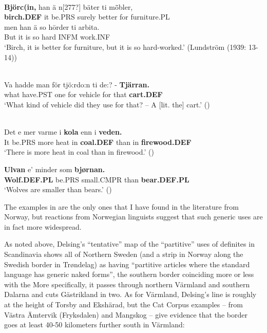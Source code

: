 \z

\ea\label{}
\\
\gll	\textbf{Björc(in,} han  ä  n[277?]  bäter  ti  m\={ö}bler,\\
		\textbf{birch.DEF} it  be.PRS  surely  better  for  furniture.PL\\
\gll 	men  han  ä  so  h\=order  ti  arbita.\\
		But  it  is  so  hard  INFM   work.INF\\
\glt	‘Birch, it is better for furniture, but it is so hard-worked.’ (Lundström (1939: 13-14))

\z

\ea\label{}
\\
\gll	Va  hadde  man  för  tjö:rdo:n  ti  de:?  {}-  \textbf{Tjärran.}\\
		what  have.PST  one  for  vehicle  for  that    \textbf{cart.DEF}\\
\glt	‘What kind of vehicle did they use for that? – A [lit. the] cart.’ (\citet[42]{Harling-KranckEtAL1998})

\z

\ea\label{}
\label{bkm:Ref135628619}{}{}\\
	\ea
		\gll	Det  e  mer  varme  i  \textbf{kola} enn  i  \textbf{veden.}\\
				It  be.PRS  more  heat  in  \textbf{coal.DEF} than  in  \textbf{firewood.DEF}\\
		\glt	‘There is more heat in coal than in firewood.’ (\citet[19]{Iversen1918})

	\ex
		\gll	\textbf{Ulvan} e’  minder  som  \textbf{bjørnan.}\\
				\textbf{Wolf.DEF.PL} be.PRS  small.CMPR  than  \textbf{bear.DEF.PL}\\
				
		\glt	‘Wolves are smaller than bears.’ (\citet[18]{Iversen1918})
	\z 
\z

The examples in  are the only ones that I have found in the literature from Norway, but reactions from Norwegian linguists suggest that such generic uses are in fact more widespread. 

As noted above, Delsing’s “tentative” map of the “partitive” uses of definites in Scandinavia shows all of Northern Sweden (and a strip in Norway along the Swedish border in Trøndelag) as having “partitive articles where the standard language has generic naked forms”, the southern border coinciding more or less with the  More specifically, it passes through northern Värmland and southern Dalarna and cuts Gästrikland in two. As for Värmland, Delsing’s line is roughly at the height of Torsby and Ekshärad, but the Cat Corpus examples – from Västra Ämtervik (Fryksdalen) and Mangskog – give evidence that the border goes at least 40-50 kilometers further south in Värmland: 

